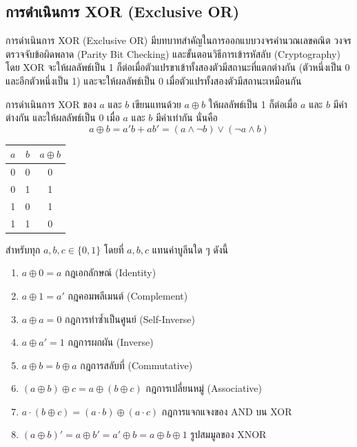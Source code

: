 \subsection{การดำเนินการ XOR (Exclusive OR)}

การดำเนินการ XOR (Exclusive OR) มีบทบาทสำคัญในการออกแบบวงจรคำนวณเลขคณิต วงจรตรวจจับข้อผิดพลาด (Parity Bit Checking) และขั้นตอนวิธีการเข้ารหัสลับ (Cryptography) โดย XOR จะให้ผลลัพธ์เป็น 1 ก็ต่อเมื่อตัวแปรขาเข้าทั้งสองตัวมีสถานะที่แตกต่างกัน (ตัวหนึ่งเป็น 0 และอีกตัวหนึ่งเป็น 1) และจะให้ผลลัพธ์เป็น 0 เมื่อตัวแปรทั้งสองตัวมีสถานะเหมือนกัน~\parencite{kolman2008discrete}

\begin{definition}
การดำเนินการ XOR ของ $a$ และ $b$ เขียนแทนด้วย $a \oplus b$ ให้ผลลัพธ์เป็น 1 ก็ต่อเมื่อ $a$ และ $b$ มีค่าต่างกัน และให้ผลลัพธ์เป็น 0 เมื่อ $a$ และ $b$ มีค่าเท่ากัน นั่นคือ
\[ a \oplus b = a'b + ab' = (a \land \neg b) \lor (\neg a \land b) \]
\end{definition}
\begin{center}
\begin{tabular}{|c|c|c|}
\hline
$a$ & $b$ & $a \oplus b$ \\
\hline
0 & 0 & 0 \\
\hline
0 & 1 & 1 \\
\hline
1 & 0 & 1 \\
\hline
1 & 1 & 0 \\
\hline
\end{tabular}
\end{center}

\begin{prop}
สำหรับทุก $a, b, c \in \{0, 1\}$ โดยที่ $a, b, c$ แทนค่าบูลีนใด ๆ ดังนี้

\begin{enumerate}
    \item $a \oplus 0 = a$ \hfill กฎเอกลักษณ์ (Identity)
    \item $a \oplus 1 = a'$ \hfill กฎคอมพลีเมนต์ (Complement)
    \item $a \oplus a = 0$ \hfill กฎการทำซ้ำเป็นศูนย์ (Self-Inverse)
    \item $a \oplus a' = 1$ \hfill กฎการผกผัน (Inverse)
    \item $a \oplus b = b \oplus a$ \hfill กฎการสลับที่ (Commutative)
    \item $(a \oplus b) \oplus c = a \oplus (b \oplus c)$ \hfill กฎการเปลี่ยนหมู่ (Associative)
    \item $a \cdot (b \oplus c) = (a \cdot b) \oplus (a \cdot c)$ \hfill กฎการแจกแจงของ AND บน XOR
    \item $(a \oplus b)' = a \oplus b' = a' \oplus b = a \oplus b \oplus 1$ \hfill รูปสมมูลของ XNOR
\end{enumerate}
\end{prop}

